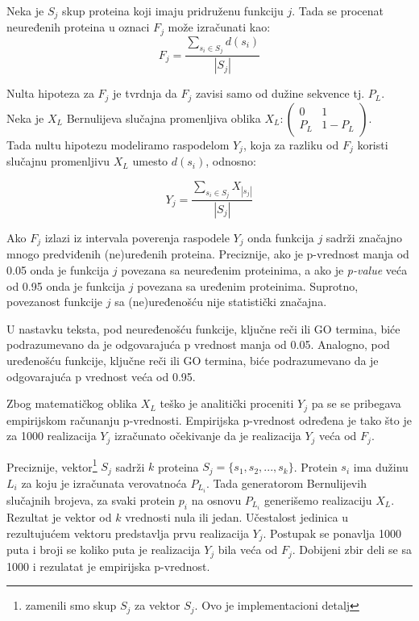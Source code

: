Neka je $S_j$ skup proteina koji imaju pridruženu funkciju $j$. Tada se procenat
neuređenih proteina u oznaci $F_j$ može izračunati kao:
$$F_j = \dfrac{\sum_{s_i \in S_j} d(s_i)} {|S_j|} $$



Nulta hipoteza za $F_j$ je tvrdnja da $F_j$ zavisi samo od dužine sekvence tj. $P_L$. \\
Neka je $X_L$ Bernulijeva slučajna promenljiva oblika $X_L : \begin{pmatrix} 0 & 1\\ P_L & 1-P_L \end{pmatrix}$. \\
Tada nultu hipotezu modeliramo raspodelom $Y_j$, koja za razliku od $F_j$ koristi
slučajnu promenljivu $X_L$ umesto  $d(s_i)$, odnosno:



$$ Y_j = \dfrac {\sum_{s_i \in S_j} {X_{|s_j|}}}{|S_j|}$$

Ako $F_j$ izlazi iz intervala poverenja raspodele $Y_j$ onda funkcija $j$
sadrži značajno mnogo predviđenih (ne)uređenih proteina. Preciznije,
ako je p-vrednost  manja od 0.05 onda je funkcija $j$ povezana sa neuređenim
proteinima, a ako je \textit{p-value} veća od 0.95 onda je funkcija $j$ povezana sa
uređenim proteinima.  Suprotno, povezanost funkcije $j$ sa (ne)uređenošću nije
statistički značajna.  

U nastavku teksta, pod neuređenošću funkcije, ključne reči ili GO termina, biće
podrazumevano da je odgovarajuća p vrednost manja od 0.05. Analogno, pod
uređenošću funkcije, ključne reči ili GO termina, biće podrazumevano da je
odgovarajuća p vrednost veća od 0.95.

Zbog matematičkog oblika $X_L$ teško je analitički proceniti $Y_j$ pa se se
pribegava empirijskom računanju p-vrednosti. Empirijska p-vrednost određena je
tako što je za 1000 realizacija $Y_j$ izračunato očekivanje da je realizacija
$Y_j$ veća od $F_j$.

Preciznije, vektor\footnote{zamenili smo skup $S_j$ za vektor $S_j$. Ovo je
implementacioni detalj} $S_j$ sadrži $k$ proteina $S_j=\{s_1, s_2, ...
,s_{k}\}$.  Protein $s_i$ ima dužinu $L_i$ za koju je izračunata verovatnoća
$P_{L_i}$.  Tada generatorom Bernulijevih slučajnih brojeva, za svaki protein
$p_i$ na osnovu $P_{L_i}$ generišemo realizaciju $X_L$. Rezultat je vektor od
$k$ vrednosti nula ili jedan. Učestalost jedinica u rezultujućem vektoru
predstavlja prvu realizacija $Y_j$.  Postupak se ponavlja 1000 puta i broji
se koliko puta je realizacija $Y_j$ bila veća od $F_j$. Dobijeni zbir deli se
sa 1000 i rezulatat je empirijska p-vrednost.

